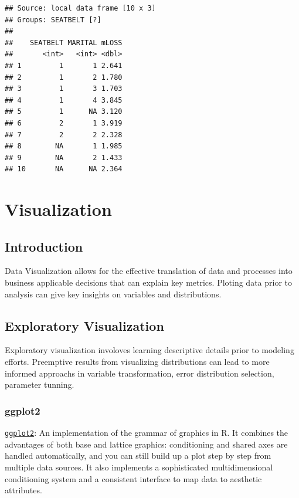 \documentclass[]{book}
\begin{document}
\begin{verbatim}
## Source: local data frame [10 x 3]
## Groups: SEATBELT [?]
## 
##    SEATBELT MARITAL mLOSS
##       <int>   <int> <dbl>
## 1         1       1 2.641
## 2         1       2 1.780
## 3         1       3 1.703
## 4         1       4 3.845
## 5         1      NA 3.120
## 6         2       1 3.919
## 7         2       2 2.328
## 8        NA       1 1.985
## 9        NA       2 1.433
## 10       NA      NA 2.364
\end{verbatim}

\chapter{Visualization}\label{viz}

\section{\texorpdfstring{\textbf{Introduction}}{Introduction}}\label{introduction-4}

Data Visualization allows for the effective translation of data and
processes into business applicable decisions that can explain key
metrics. Ploting data prior to analysis can give key insights on
variables and distributions.

\section{\texorpdfstring{\textbf{Exploratory
Visualization}}{Exploratory Visualization}}\label{exploratory-visualization}

Exploratory visualization involoves learning descriptive details prior
to modeling efforts. Preemptive results from visualizing distributions
can lead to more informed approachs in variable transformation, error
distribution selection, parameter tunning.

\subsection{\texorpdfstring{\textbf{ggplot2}}{ggplot2}}\label{ggplot2}

\href{https://cran.r-project.org/web/packages/ggplot2/index.html}{\texttt{ggplot2}}:
An implementation of the grammar of graphics in R. It combines the
advantages of both base and lattice graphics: conditioning and shared
axes are handled automatically, and you can still build up a plot step
by step from multiple data sources. It also implements a sophisticated
multidimensional conditioning system and a consistent interface to map
data to aesthetic attributes.
\end{document}

